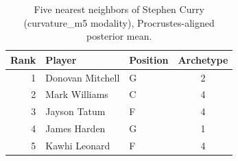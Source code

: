\begin{table}[htbp]
  \centering\small
  \begin{tabular}{rllc}
    \toprule
    Rank & Player & Position & Archetype \\
    \midrule
    1 & Donovan Mitchell & G & 2 \\
    2 & Mark Williams & C & 4 \\
    3 & Jayson Tatum & F & 4 \\
    4 & James Harden & G & 1 \\
    5 & Kawhi Leonard & F & 4 \\
    \bottomrule
  \end{tabular}
  \caption{Five nearest neighbors of Stephen Curry (curvature_m5 modality), Procrustes-aligned posterior mean.}
  \label{tab:Stephen_Curry_neighbors_curvature_m5}
\end{table}

